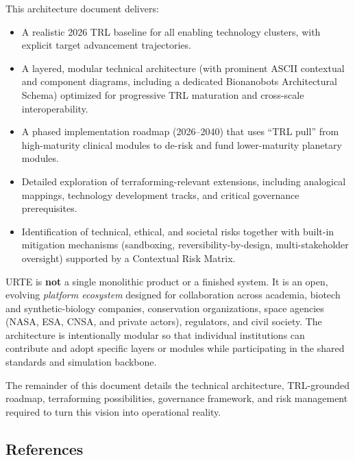 \documentclass[11pt,a4paper]{article}
\begin{document}
This architecture document delivers:
\begin{itemize}[leftmargin=*,itemsep=0.2em]
    \item A realistic 2026 TRL baseline for all enabling technology clusters, with explicit target advancement trajectories.
    \item A layered, modular technical architecture (with prominent ASCII contextual and component diagrams, including a dedicated Bionanobots Architectural Schema) optimized for progressive TRL maturation and cross-scale interoperability.
    \item A phased implementation roadmap (2026--2040) that uses ``TRL pull'' from high-maturity clinical modules to de-risk and fund lower-maturity planetary modules.
    \item Detailed exploration of terraforming-relevant extensions, including analogical mappings, technology development tracks, and critical governance prerequisites.
    \item Identification of technical, ethical, and societal risks together with built-in mitigation mechanisms (sandboxing, reversibility-by-design, multi-stakeholder oversight) supported by a Contextual Risk Matrix.
\end{itemize}

URTE is \textbf{not} a single monolithic product or a finished system. It is an open, evolving \textit{platform ecosystem} designed for collaboration across academia, biotech and synthetic-biology companies, conservation organizations, space agencies (NASA, ESA, CNSA, and private actors), regulators, and civil society. The architecture is intentionally modular so that individual institutions can contribute and adopt specific layers or modules while participating in the shared standards and simulation backbone.

The remainder of this document details the technical architecture, TRL-grounded roadmap, terraforming possibilities, governance framework, and risk management required to turn this vision into operational reality.

\subsection{References}
\end{document}
